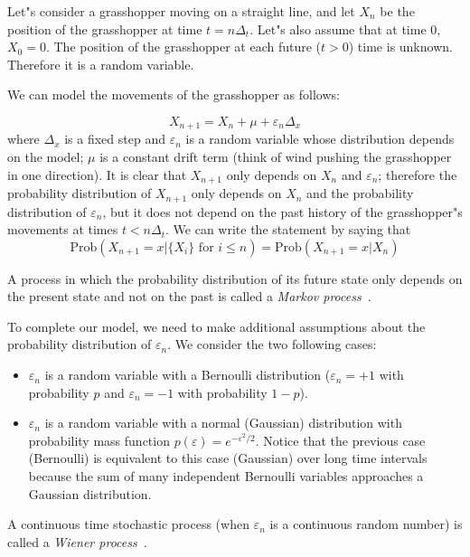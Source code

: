 \documentclass[justified, sixbynine]{tufte-book}
\theoremstyle{plain}%
\newtheorem * {corollary}{Corollary}
\theoremstyle{definition}
\theoremstyle{remark}
\newtheorem * {remark}{Remark}
\newtheorem * {note}{Note}
\begin{document}
\begin{fullwidth}
Let"s consider a grasshopper moving on a straight line, and let $X_n$ be the
position of the grasshopper at time $t=n\Delta _t$. Let"s also assume that at time 0, 
$X_0=0$. The position of the grasshopper at each future ($t>0$) time is unknown.
Therefore it is a random variable.

We can model the movements of the grasshopper as follows:

\begin{equation}
X_{n+1}=X_n + \mu + \varepsilon _n\Delta _x  \label{markov1}
\end{equation}
where $\Delta _x$ is a fixed step and $\varepsilon _n$ is a random variable
whose distribution depends on the model; $\mu$ is a constant drift term
(think of wind pushing the grasshopper in one direction).
It is clear that $X_{n+1}$ only
depends on $X_n$ and $\varepsilon _n$; therefore the probability distribution
of $X_{n+1}$ only depends on $X_n$ and the probability distribution of $%
\varepsilon _n$, but it does not depend on the past history of the grasshopper"s movements at
times $t<n\Delta _t$. We can write the statement by saying that
\begin{equation}
\textrm{Prob}(X_{n+1}=x|\{X_i\}\text{ for }i\leq n)=\textrm{Prob}(X_{n+1}=x|X_n)  \label{markov2}
\end{equation}

A process in which the probability distribution of its future state only
depends on the present state and not on the past is called a
{\it Markov process}~\cite{markov}.

To complete our model, we need to make additional assumptions about the
probability distribution of $\varepsilon _n$. We consider the two following cases:

\begin{itemize}
\item  $\varepsilon _n$ is a random variable with a Bernoulli distribution ($%
\varepsilon _n=+1$ with probability $p$ and $\varepsilon _n=-1$ with
probability $1-p$).

\item  $\varepsilon _n$ is a random variable with a normal (Gaussian)
distribution with probability mass function $p(\varepsilon
)=e^{-\varepsilon ^2/2}$. Notice that the previous case (Bernoulli) is equivalent to this case (Gaussian) over long time intervals because the sum of many independent Bernoulli variables approaches a Gaussian distribution.
\end{itemize}

A continuous time stochastic process (when
$\varepsilon _n$ is a continuous random number)
is called a {\it Wiener process}~\cite{wiener}.


\end{fullwidth}
\end{document}
